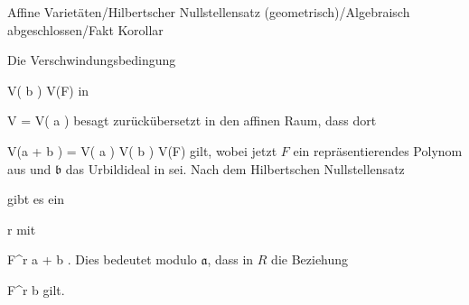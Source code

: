 {Affine Varietäten/Hilbertscher Nullstellensatz (geometrisch)/Algebraisch abgeschlossen/Fakt}
{Korollar}
{}
{



\faktsituation {}
\faktzusatz {}
\faktzusatz {}





}
{





Die Verschwindungsbedingung

\mavergleichskette
{\vergleichskette
{ V( {\mathfrak b} )
}
{ \subseteq }{ V(F)
}
{  }{
}
{    }{
}
{   }{}
}
{}{}{}
in

\mavergleichskette
{\vergleichskette
{ V
}
{ = }{ V( {\mathfrak a} )
}
{  }{
}
{    }{
}
{   }{
}
}
{}{}{}
besagt zurückübersetzt in den affinen Raum, dass dort

\mavergleichskette
{\vergleichskette
{ V({\mathfrak a} + {\mathfrak b} )
}
{ = }{ V( {\mathfrak a} ) \cap V( {\mathfrak b} )
}
{ \subseteq }{ V(F)
}
{    }{
}
{   }{
}
}
{}{}{}
gilt, wobei jetzt $F$ ein repräsentierendes Polynom aus
 und ${\mathfrak b}$ das Urbildideal in
 sei. Nach
dem
Hilbertschen Nullstellensatz

 {} {}
gibt es ein

\mavergleichskette
{\vergleichskette
{ r
}
{ \in }{ \N
}
{  }{
}
{    }{
}
{   }{
}
}
{}{}{}
mit

\mavergleichskette
{\vergleichskette
{ F^r
}
{ \in }{ {\mathfrak a} + {\mathfrak b}
}
{  }{
}
{    }{
}
{   }{
}
}
{}{}{.}
Dies bedeutet modulo ${\mathfrak a}$, dass in $R$ die Beziehung

\mavergleichskette
{\vergleichskette
{ F^r
}
{ \in }{ {\mathfrak b}
}
{  }{
}
{    }{
}
{   }{
}
}
{}{}{}
gilt.




}






